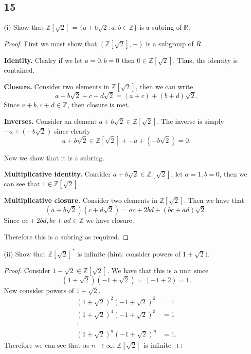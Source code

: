 \documentclass{article}
\newcommand{\Z}{\mathbb{Z}}
\newcommand{\R}{\mathbb{R}}
\newenvironment{hwproof}[1]
{
    #1
    \begin{proof}
}{
    \end{proof}
}
\begin{document}
\subsection*{15}
\begin{hwproof}
    {
        (i) Show that $\Z[\sqrt{2}] = \{a + b\sqrt{2} : a,b \in \Z\}$ is a
        subring of $\R$.
    }
    First we must show that $(\Z[\sqrt{2}], +)$ is a subgroup of $R$.

    \textbf{Identity.}
    Clealry if we let $a=0, b = 0$ then $0 \in \Z[\sqrt{2}]$. Thus, the identity
    is contained.

    \textbf{Closure.}
    Consider two elements in $\Z[\sqrt{2}]$, then we can write
    \begin{equation*}
        a + b\sqrt{2} + c + d\sqrt{2} = (a + c) + (b + d)\sqrt{2}.
    \end{equation*}
    Since $a + b, c+ d \in \Z$, then closure is met.

    \textbf{Inverses.}
    Consider an element $a + b\sqrt{2} \in \Z[\sqrt{2}]$. The inverse is simply
    $-a + (-b\sqrt{2})$ since clearly
    \begin{equation*}
        a + b\sqrt{2} \in \Z[\sqrt{2}] + -a + (-b\sqrt{2}) = 0.
    \end{equation*}

    Now we show that it is a subring.

    \textbf{Multiplicative identity.}
    Consider $a + b\sqrt{2} \in \Z[\sqrt{2}]$, let $a = 1, b = 0$, then
    we can see that $1 \in \Z[\sqrt{2}]$.

    \textbf{Multiplicative closure.}
    Consider two elements in $\Z[\sqrt{2}]$. Then we have that
    \begin{equation*}
        (a + b\sqrt{2})(c + d\sqrt{2}) = ac + 2bd + (bc + ad)\sqrt{2}.
    \end{equation*}
    Since $ac + 2bd, bc + ad \in \Z$ we have closure.

    Therefore this is a subring as required.
\end{hwproof}
\begin{hwproof}
    {
        (ii) Show that $\Z[\sqrt{2}]^*$ is infinite (hint: consider powers of
        $1 + \sqrt{2})$.
    }
    Consider $1 + \sqrt{2} \in \Z[\sqrt{2}]$. We have that this is a unit since
    \begin{equation*}
        (1 + \sqrt{2})(-1 + \sqrt{2}) = (-1 + 2) = 1.
    \end{equation*}
    Now consider powers of $1 + \sqrt{2}$.
    \begin{align*}
        (1 + \sqrt{2})^2(-1 + \sqrt{2})^2 & = 1  \\
        (1 + \sqrt{2})^3(-1 + \sqrt{2})^3 & = 1  \\
        \vdots                                   \\
        (1 + \sqrt{2})^n(-1 + \sqrt{2})^n & = 1.
    \end{align*}
    Therefore we can see that as $n \to \infty$, $\Z[\sqrt{2}]$ is infinite.
\end{hwproof}
\end{document}
